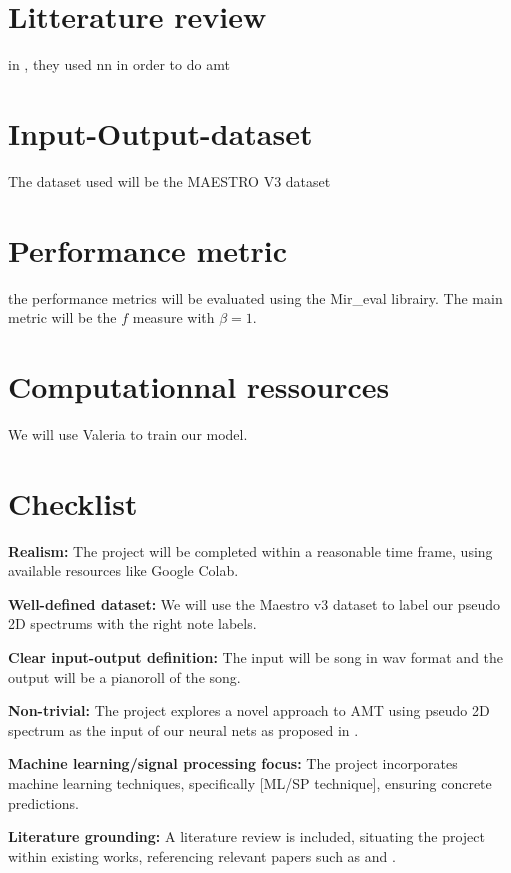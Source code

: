 \documentclass[12pt]{article}
\newcommand{\cmark}{\ding{51}}%
\newcommand{\done}{\rlap{$\square$}{\raisebox{2pt}{\large\hspace{1pt}\cmark}}%
\hspace{-2.5pt}}
\begin{document}
\section{Litterature review}
in \cite{Liu2020}, they used \acrlong{nn} in order to do \acrlong{amt} 
\section{Input-Output-dataset}
The dataset used will be the MAESTRO V3 dataset\cite{hawthorne2018enabling}
\section{Performance metric}
the performance metrics will be evaluated using the Mir\_eval librairy. The main metric will be the $f$ measure with $\beta = 1$.
\section{Computationnal ressources}
We will use Valeria to train our model.
\section*{Checklist}

\begin{todolist}
    \item[\done] \textbf{Realism:} The project will be completed within a reasonable time frame, using available resources like Google Colab.
    
    \item[\done] \textbf{Well-defined dataset:} We will use the Maestro v3 dataset to label our pseudo 2D spectrums with the right note labels.
    
    \item[\done] \textbf{Clear input-output definition:} The input will be song in wav format and the output will be a pianoroll of the song.
    
    \item[\done] \textbf{Non-trivial:} The project explores a novel approach to AMT using pseudo 2D spectrum as the input of our neural nets as proposed in \cite{Zhang2020}. 
    
    \item[\done] \textbf{Machine learning/signal processing focus:} The project incorporates machine learning techniques, specifically [ML/SP technique], ensuring concrete predictions.
    
    \item[\done] \textbf{Literature grounding:} A literature review is included, situating the project within existing works, referencing relevant papers such as \cite{Zhang2020} and \cite{Liu2020}.
\end{todolist}

\printglossary
\printglossary[type=\acronymtype]



\printbibliography
\end{document}
